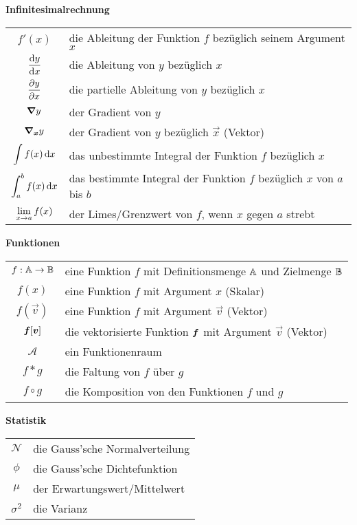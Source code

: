 \begin{center}\textbf{Infinitesimalrechnung}\end{center}
\begin{tabular}{cl}
  $f'(x)$ & die Ableitung der Funktion $f$ bezüglich seinem Argument $x$ \\
  $\displaystyle\frac{\text{d}y}{\text{d}x}$ & die Ableitung von $y$ bezüglich $x$ \\[2ex]
  $\displaystyle\frac{\partial y}{\partial x}$ & die partielle Ableitung von $y$ bezüglich $x$ \\[2ex]
  $\bm{\nabla} y$ & der Gradient von $y$\\
  $\bm{\nabla}_{\bm{x}}y$ & der Gradient von $y$ bezüglich $\vec{x}$ (Vektor) \\
  $\displaystyle\int f(x)\,\text{d}x$ & das unbestimmte Integral der Funktion $f$ bezüglich $x$ \\
  $\displaystyle\int_a^b f(x)\,\text{d}x$ & das bestimmte Integral der Funktion $f$ bezüglich $x$ von $a$ bis $b$ \\
  $\displaystyle\lim_{x \to a} f(x)$ & der Limes/Grenzwert von $f$, wenn $x$ gegen $a$ strebt \\

\end{tabular}

\begin{center}\textbf{Funktionen}\end{center}
\begin{tabular}{cl}
  $f: \mathbb{A} \to \mathbb{B}$ & eine Funktion $f$ mit Definitionsmenge $\mathbb{A}$ und Zielmenge $\mathbb{B}$ \\
  $f(x)$ & eine Funktion $f$ mit Argument $x$ (Skalar) \\
  $f(\vec{v})$ & eine Funktion $f$ mit Argument $\vec{v}$ (Vektor) \\
  $\bm{f}[\bm{v}]$ & die vektorisierte Funktion $\bm{f}$ mit Argument $\vec{v}$ (Vektor) \\
  $\mathcal{A}$ & ein Funktionenraum \\
  $f * g$ & die Faltung von $f$ über $g$ \\
  $f \circ g$ & die Komposition von den Funktionen $f$ und $g$ \\

\end{tabular}

\begin{center}\textbf{Statistik}\end{center}
\begin{tabular}{cl}
  $\mathcal{N}$ & die Gauss'sche Normalverteilung \\
  $\phi$ & die Gauss'sche Dichtefunktion \\
  $\mu$ & der Erwartungswert/Mittelwert \\
  $\sigma^2$ & die Varianz
\end{tabular}


